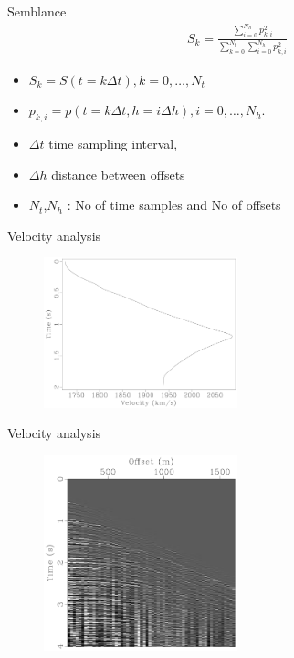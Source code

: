 \documentclass[xcolor=dvipsnames,notes]{beamer}
\begin{document}
%
\begin{frame}{Semblance}
\begin{eqnarray}
S_k = \frac{\sum_{i=0}^{N_h} p^2_{k,i}}{\sum_{k=0}^{N_t} \sum_{i=0}^{N_h} p^2_{k,i}}
\end{eqnarray}
\begin{itemize}
 \item $S_k = S(t=k\Delta t), k=0,\ldots,N_t$ 
 \item $p_{k,i}=p(t=k\Delta t,h=i\Delta h), i=0,\ldots,N_h$. 
 \item $\Delta t$ time sampling interval, 
 \item $\Delta h$ distance between offsets \item $N_t$,$N_h$ :
No of time samples and No of  offsets
\end{itemize}
\end{frame}
\begin{frame}{Velocity analysis}
\begin{figure}
 \includegraphics[width=0.50\textwidth]{Fig/synvel.pdf}
\end{figure}
\end{frame}
\begin{frame}{Velocity analysis}
\begin{figure}
 \includegraphics[width=0.50\textwidth]{Fig/cmp.pdf}
\end{figure}
\end{frame}
\end{document}
